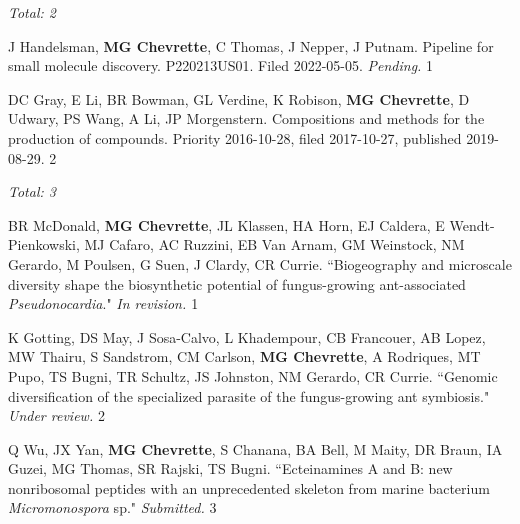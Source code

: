 \begin{cvpubs}

\cvpub
{\hspace{-1cm} \textit{Total: 2}} %
{}

\cvpub
{J Handelsman, \textbf{MG Chevrette}, C Thomas, J Nepper, J Putnam. Pipeline for small molecule discovery. P220213US01. Filed 2022-05-05. \textit{Pending.}}
{1}

\cvpub
{DC Gray, E Li, BR Bowman, GL Verdine, K Robison, \textbf{MG Chevrette}, D Udwary, PS Wang, A Li, JP Morgenstern. Compositions and methods for the production of compounds. Priority 2016-10-28, filed 2017-10-27, published 2019-08-29. \textbf{\textit{}}}
{2}

\end{cvpubs}


 \vspace{-2mm}

\begin{cvpubs}

\cvpub
{\hspace{-1cm} \textit{Total: 3}} %
{}

\cvpub
{BR McDonald, \textbf{MG Chevrette}, JL Klassen, HA Horn, EJ Caldera, E Wendt-Pienkowski, MJ Cafaro, AC Ruzzini, EB Van Arnam, GM Weinstock, NM Gerardo, M Poulsen, G Suen, J Clardy, CR Currie. ``Biogeography and microscale diversity shape the biosynthetic potential of fungus-growing ant-associated \textit{Pseudonocardia}." \textit{In revision. \textbf{}}}
{1}

\cvpub
{K Gotting, DS May, J Sosa-Calvo, L Khadempour, CB Francouer, AB Lopez, MW Thairu, S Sandstrom, CM Carlson, \textbf{MG Chevrette}, A Rodriques, MT Pupo, TS Bugni, TR Schultz, JS Johnston, NM Gerardo, CR Currie. ``Genomic diversification of the specialized parasite of the fungus-growing ant symbiosis." \textit{Under review.}}
{2}

\cvpub
{Q Wu, JX Yan, \textbf{MG Chevrette}, S Chanana, BA Bell, M Maity, DR Braun, IA Guzei, MG Thomas, SR Rajski, TS Bugni. ``Ecteinamines A and B: new nonribosomal peptides with an unprecedented skeleton from marine bacterium \textit{Micromonospora} sp." \textit{Submitted.}}
{3}

\end{cvpubs}